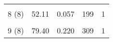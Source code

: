 \begin{table}[H]
{\begin{tabular}{|ccccc|}
\multicolumn{1}{|c|}{}                                                                                                                  & \multicolumn{1}{c|}{}                                                                                                                      & \multicolumn{1}{c|}{}                                                                                                                              & \multicolumn{1}{c|}{}                                                                                                                         &                                                      \\
\multicolumn{1}{|c|}{\multirow{-2}{*}{8 (8)}}                                                                                           & \multicolumn{1}{c|}{\multirow{-2}{*}{52.11}}                                                                                               & \multicolumn{1}{c|}{\multirow{-2}{*}{0.057}}                                                                                                       & \multicolumn{1}{c|}{\multirow{-2}{*}{199}}                                                                                                    & \multirow{-2}{*}{1}                                  \\ \hline
\multicolumn{1}{|c|}{}                                                                                                                  & \multicolumn{1}{c|}{}                                                                                                                      & \multicolumn{1}{c|}{}                                                                                                                              & \multicolumn{1}{c|}{}                                                                                                                         &                                                      \\
\multicolumn{1}{|c|}{\multirow{-2}{*}{9 (8)}}                                                                                           & \multicolumn{1}{c|}{\multirow{-2}{*}{79.40}}                                                                                               & \multicolumn{1}{c|}{\multirow{-2}{*}{0.220}}                                                                                                       & \multicolumn{1}{c|}{\multirow{-2}{*}{309}}                                                                                                    & \multirow{-2}{*}{1}                                  \\ \hline

\end{tabular}}
\end{table}
